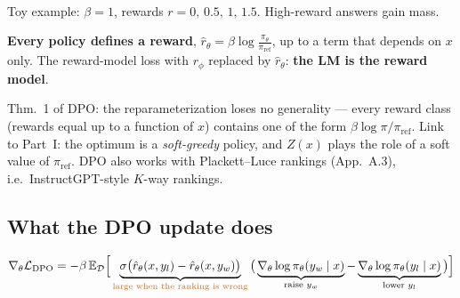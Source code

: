 \begin{minipage}[c]{0.5\linewidth}
\centering
{}\\
{\scriptsize Toy example: $\beta=1$, rewards $r=0,\,0.5,\,1,\,1.5$. High-reward answers gain mass.}
\end{minipage}\hfill
\begin{minipage}[c]{0.46\linewidth}
\begin{keybox}[title={Read it backwards}]
\textbf{Every policy defines a reward}, $\hat r_\theta=\beta\log\frac{\pi_\theta}{\pi_{\mathrm{ref}}}$, up to a term that depends on $x$ only. The reward-model loss with $r_\phi$ replaced by $\hat r_\theta$: \textbf{the LM is the reward model}.
\end{keybox}
\end{minipage}

\begin{notebox}
Thm.~1 of DPO: the reparameterization loses no generality --- every reward class (rewards equal up to a function of $x$) contains one of the form $\beta\log\pi/\pi_{\mathrm{ref}}$. Link to Part~I: the optimum is a \emph{soft-greedy} policy, and $Z(x)$ plays the role of a soft value of $\pi_{\mathrm{ref}}$. DPO also works with Plackett--Luce rankings (App.~A.3), i.e.\ InstructGPT-style $K$-way rankings.
\end{notebox}

\subsection{What the DPO update does}

\begin{gather*}
  \nabla_\theta\mathcal L_{\mathrm{DPO}} = -\beta\,\E_{\mathcal D}\Big[
    \underbrace{\sigma\big(\hat r_\theta(x,y_l)-\hat r_\theta(x,y_w)\big)}_{\text{\color{AtlasWarm}large when the ranking is wrong}}
    \big(\underbrace{\nabla_\theta\log\pi_\theta(y_w\mid x)}_{\text{raise }y_w} - \underbrace{\nabla_\theta\log\pi_\theta(y_l\mid x)}_{\text{lower }y_l}\big)\Big]
\end{gather*}

